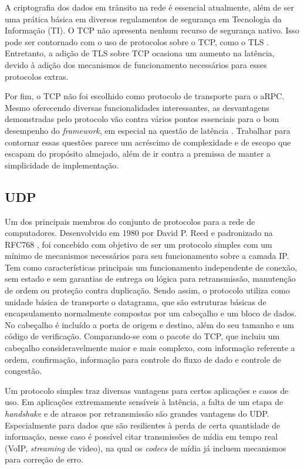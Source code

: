 A criptografia dos dados em trânsito na rede é essencial atualmente, além de ser uma prática básica em diversos regulamentos de segurança em Tecnologia da Informação (TI). O TCP não apresenta nenhum recurso de segurança nativo. Isso pode ser contornado com o uso de protocolos sobre o TCP, como o TLS \cite{rfc5246}. Entretanto, a adição de TLS sobre TCP ocasiona um aumento na latência, devido à adição dos mecanismos de funcionamento necessários para esses protocolos extras.

Por fim, o TCP não foi escolhido como protocolo de transporte para o aRPC. Mesmo oferecendo diversas funcionalidades interessantes, as desvantagens demonstradas pelo protocolo vão contra vários pontos essenciais para o bom desempenho do \textit{framework}, em especial na questão de latência \cite{lakshman1997performance}. Trabalhar para contornar essas questões parece um acréscimo de complexidade e de escopo que escapam do propósito almejado, além de ir contra a premissa de manter a simplicidade de implementação.

\subsection{UDP}
\label{subsec:udp}

Um dos principais membros do conjunto de protocolos para a rede de computadores. Desenvolvido em 1980 por David P. Reed e padronizado na RFC768 \cite{postel_user_1980}, foi concebido com objetivo de ser um protocolo simples com um mínimo de mecanismos necessários para seu funcionamento sobre a camada IP. Tem como características principais um funcionamento independente de conexão, sem estado e sem garantias de entrega ou lógica para retransmissão, manutenção de ordem ou proteção contra duplicação. Sendo assim, o protocolo utiliza como unidade básica de transporte o datagrama, que são estruturas básicas de encapsulamento normalmente compostas por um cabeçalho e um bloco de dados. No cabeçalho é incluído a porta de origem e destino, além do seu tamanho e um código de verificação. Comparando-se com o pacote do TCP, que incluiu um cabeçalho consideravelmente maior e mais complexo, com informação referente a ordem, confirmação, informação para controle do fluxo de dado e controle de congestão.

Um protocolo simples traz diversas vantagens para certos aplicações e casos de uso. Em aplicações extremamente sensíveis à latência, a falta de um etapa de \textit{handshake} e de atrasos por retransmissão são grandes vantagens do UDP. Especialmente para dados que são resilientes à perda de certa quantidade de informação, nesse caso é possível citar transmissões de mídia em tempo real (VoIP, \textit{streaming} de video), na qual os \textit{codecs} de mídia já incluem mecanismos para correção de erro.


